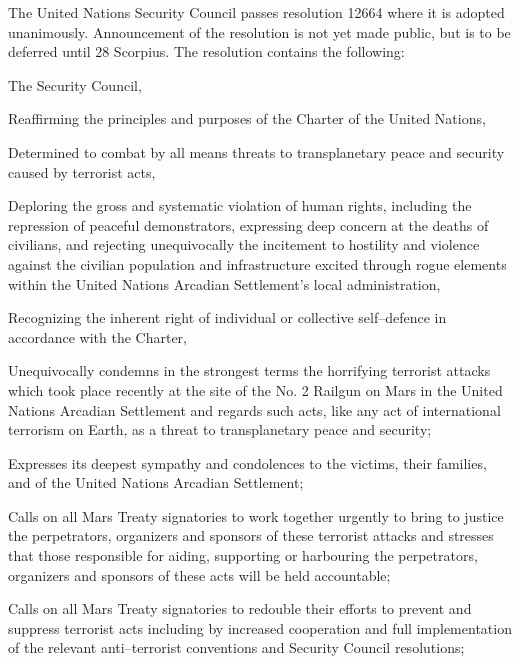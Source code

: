 

The United Nations Security Council passes resolution 12664 where it is adopted unanimously. Announcement of the resolution is not yet made public, but is to be deferred until 28 Scorpius. The resolution contains the following:

\startTimelineGeneralDocument
The Security Council,

Reaffirming the principles and purposes of the Charter of the United Nations,

Determined to combat by all means threats to transplanetary peace and security caused by terrorist acts,

Deploring the gross and systematic violation of human rights, including the repression of peaceful demonstrators, expressing deep concern at the deaths of civilians, and rejecting unequivocally the incitement to hostility and violence against the civilian population and infrastructure excited through rogue elements within the United Nations Arcadian Settlement's local administration,

Recognizing the inherent right of individual or collective self--defence in accordance with the Charter,

\startitemize[R]
\item Unequivocally condemns in the strongest terms the horrifying terrorist attacks which took place recently at the site of the No. \type{#}2 Railgun on Mars in the United Nations Arcadian Settlement and regards such acts, like any act of international terrorism on Earth, as a threat to transplanetary peace and security;

\item Expresses its deepest sympathy and condolences to the victims, their families, and of the United Nations Arcadian Settlement;

\item Calls on all Mars Treaty signatories to work together urgently to bring to justice the perpetrators, organizers and sponsors of these terrorist attacks and stresses that those responsible for aiding, supporting or harbouring the perpetrators, organizers and sponsors of these acts will be held accountable;

\item Calls on all Mars Treaty signatories to redouble their efforts to prevent and suppress terrorist acts including by increased cooperation and full implementation of the relevant anti--terrorist conventions and Security Council resolutions;

